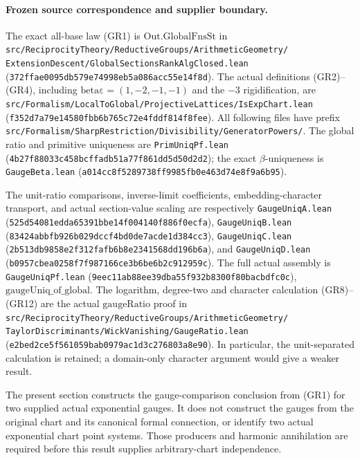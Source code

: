 \paragraph{Frozen source correspondence and supplier boundary.}
The exact all-base law (GR1) is
\(\mathrm{Out.GlobalFnsSt}\) in
\texttt{src/ReciprocityTheory/ReductiveGroups/ArithmeticGeometry/}
\texttt{ExtensionDescent/GlobalSectionsRankAlgClosed.lean}
(\texttt{372ffae0095db579e74998eb5a086acc55e14f8d}).
The actual definitions (GR2)--(GR4), including
\(\mathrm{beta\varepsilon}=(1,-2,-1,-1)\) and the
\(-3\) rigidification, are
\texttt{src/Formalism/LocalToGlobal/ProjectiveLattices/IsExpChart.lean}
(\texttt{f352d7a79e14580fbb6b765c72e4fddf814f8fee}).
All following files have prefix
\texttt{src/Formalism/SharpRestriction/Divisibility/GeneratorPowers/}.
The global ratio and primitive uniqueness are
\texttt{PrimUniqPf.lean}
(\texttt{4b27f88033c458bcffadb51a77f861dd5d50d2d2});
the exact \(\beta\)-uniqueness is
\texttt{GaugeBeta.lean}
(\texttt{a014cc8f5289738ff9985fb0e463d74e8f9a6b95}).

The unit-ratio comparisons, inverse-limit coefficients,
embedding-character transport, and actual section-value
scaling are respectively
\texttt{GaugeUniqA.lean}
(\texttt{525d54081edda65391bbe14f004140f886f0ecfa}),
\texttt{GaugeUniqB.lean}
(\texttt{83424abbfb926b029dccf4bd0de7acde1d384cc3}),
\texttt{GaugeUniqC.lean}
(\texttt{2b513db9858e2f312fafb6b8e2341568dd196b6a}),
and \texttt{GaugeUniqD.lean}
(\texttt{b0957cbea0258f7f987166ce3b6be6b2c912959c}).
The full actual assembly is
\texttt{GaugeUniqPf.lean}
(\texttt{9eec11ab88ee39dba55f932b8300f80bacbdfc0c}),
\(\mathrm{gaugeUniq\_of\_global}\).
The logarithm, degree-two and character calculation
(GR8)--(GR12) are the actual \(\mathrm{gaugeRatio}\)
proof in
\texttt{src/ReciprocityTheory/ReductiveGroups/ArithmeticGeometry/}
\texttt{TaylorDiscriminants/WickVanishing/GaugeRatio.lean}
(\texttt{e2bed2ce5f561059bab0979ac1d3c276803a8e90}).
In particular, the unit-separated calculation is retained;
a domain-only character argument would give a weaker result.

The present section constructs the gauge-comparison
conclusion from (GR1) for two supplied actual
exponential gauges.  It does not construct the gauges
from the original chart and its canonical formal
connection, or identify two actual exponential chart
point systems.  Those producers and harmonic
annihilation are required before this result supplies
arbitrary-chart independence.
